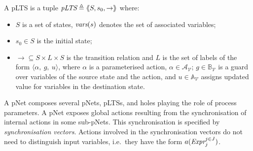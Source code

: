\documentclass{llncs}
\newcommand{\Simon}{\\\hfill\mdash Simon}
\newcommand{\noteSB}[2][color=green!40, size=\tiny]{\todo[#1]{{#2}\Simon}}
\newcommand{\Ludo}{\\\hfill\mdash Ludo}
\newcommand{\noteLH}[2][color=orange!40, size=\tiny]{\todo[#1]{{#2}\Ludo}}
\newcommand{\cA}{\ensuremath{\mathcal{A}}}
\newcommand{\sA}{\ensuremath{\mathbb{A}}}
\newcommand{\sB}{\ensuremath{\mathbb{B}}}
\newcommand{\cV}{\ensuremath{\mathcal{V}}}
\newcommand{\mdash}[1][]{---#1}
\newcommand{\ie}[1][\ ]{i.e.#1}
\newcommand{\variables}{\ensuremath{\cV}}
\newcommand{\actions}[1]{\ensuremath{\cA_{#1}}}
\newcommand{\boolexprs}[1]{\ensuremath{\sB_{#1}}}
\newcommand{\assigns}[1]{\ensuremath{\sA_{#1}}}
\begin{document}
\begin{definition}[pLTS]
\label{pLTS}
A pLTS is a tuple
$\pLTS\triangleq\mylangle S,s_0, \to\myrangle$ where:
\begin{itemize}
\item
$S$ is a set of states, $\vars(s)$ denotes the set of associated variables;
\item
$s_0 \in S$ is the initial state;
\item $\to \subseteq S \times L \times S$ is the transition relation and 
$L$ is the set of labels of the form
$\langle \alpha,~g,~u\rangle$,
where $\alpha$ is a parameterised action, $\alpha \in\actions{\variables}$; 
$g\in\boolexprs{\variables}$ is a guard over variables of the source state and the 
action, and $u\in\assigns{\variables}$
assigns updated value for variables in the destination state. 
\end{itemize}
\end{definition}
A pNet composes several pNets, pLTSs, and holes playing the role of process parameters.
A  pNet  exposes
 global actions resulting from the synchronisation of internal actions in some sub-pNets. 
This synchronisation  is specified by  \emph{synchronisation vectors}.
Actions involved in the synchronisation vectors do
not need to distinguish input variables, \ie they 
have the form $a(\Expr_j^{j \in J})$.
\end{document}
